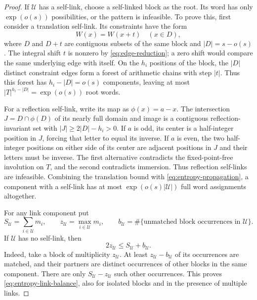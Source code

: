 \begin{proof}
If \(\mathcal U\) has a self-link, choose a self-linked block as the
root. Its word has only \(\exp(o(s))\) possibilities, or the pattern is
infeasible. To prove this, first consider a translation self-link. Its
constraints have the form
\[
 W(x)=W(x+t)\quad(x\in D),
\]
where \(D\) and \(D+t\) are contiguous subsets of the same block and
\(|D|=s-o(s)\).  The integral shift \(t\) is nonzero by
\eqref{eq:edge-reduction}; a zero shift would compare the same underlying
edge with itself.  On the \(h_i\) positions of the block, the
\(|D|\) distinct constraint edges form a forest of arithmetic chains
with step \(|t|\).  Thus this forest has \(h_i-|D|=o(s)\) components,
leaving at most \(|T|^{h_i-|D|}=\exp(o(s))\) root words.

For a reflection self-link, write its map as \(\phi(x)=a-x\).  The
intersection \(J=D\cap\phi(D)\) of its nearly full domain and image is
a contiguous reflection-invariant set with
\(|J|\ge2|D|-h_i>0\).  If \(a\) is odd, its center is a half-integer
position in \(J\), forcing that letter to equal its inverse.  If \(a\)
is even, the two half-integer positions on either side of its center
are adjacent positions in \(J\) and their letters must be inverse.
The first alternative contradicts the fixed-point-free involution on
\(T\), and the second contradicts immersion.  Thus reflection self-links
are infeasible.  Combining the translation bound with
\eqref{eq:entropy-propagation}, a component with a self-link has at most
\(\exp(o(s)|\mathcal U|)\) full word assignments altogether.

For any link component put
\[
 S_{\mathcal U}=\sum_{i\in\mathcal U}m_i,\qquad
 z_{\mathcal U}=\max_{i\in\mathcal U}m_i,\qquad
 b_{\mathcal U}=\#\{\text{unmatched block occurrences in }\mathcal U\}.
\]
If \(\mathcal U\) has no self-link, then
\begin{equation}
 2z_{\mathcal U}\le S_{\mathcal U}+b_{\mathcal U}.
 \label{eq:entropy-link-balance}
\end{equation}
Indeed, take a block of multiplicity \(z_{\mathcal U}\).  At least
\(z_{\mathcal U}-b_{\mathcal U}\) of its occurrences are matched, and
their partners are distinct occurrences of other blocks in the same
component.  There are only \(S_{\mathcal U}-z_{\mathcal U}\) such other
occurrences.  This proves \eqref{eq:entropy-link-balance}, also for
isolated blocks and in the presence of multiple links.


\end{proof}

